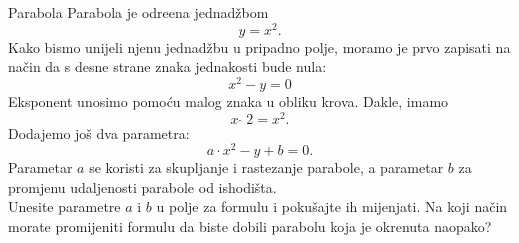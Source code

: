 \begin{surferPage}[Parabola]{Parabola}
Parabola je odre\dj ena jednad\v zbom \[y=x^2.\]
Kako bismo unijeli njenu jednad\v zbu u pripadno polje, moramo je prvo zapisati na na\v cin da s desne strane znaka jednakosti bude nula:
\[x^2-y=0\]
Eksponent unosimo pomo\' cu malog znaka u obliku krova. Dakle, imamo
\[ x  \,\hat{\ } \, 2 =x^2.\]
Dodajemo jo\v s dva parametra:
\[a \cdot x^2-y+b=0.\]
Parametar $a$ se koristi za skupljanje i rastezanje parabole, a parametar $b$ za promjenu udaljenosti parabole od ishodi\v sta.\\
\newline
Unesite parametre $a$ i $b$ u polje za formulu i poku\v sajte ih mijenjati. Na koji na\v cin morate promijeniti formulu da biste dobili parabolu koja je okrenuta naopako?
\end{surferPage}
